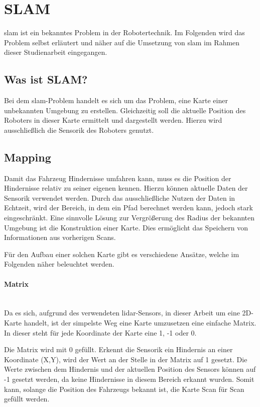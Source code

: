 \section{SLAM}
\label{slam}\ac{slam} ist ein bekanntes Problem in der Robotertechnik. 
Im Folgenden wird das Problem selbst erläutert und näher auf die Umsetzung von \ac{slam} im Rahmen dieser Studienarbeit eingegangen.

\subsection{Was ist SLAM?}
Bei dem \ac{slam}-Problem handelt es sich um das Problem, eine Karte einer unbekannten Umgebung zu erstellen.
Gleichzeitig soll die aktuelle Position des Roboters in dieser Karte ermittelt und dargestellt werden.
Hierzu wird ausschließlich die Sensorik des Roboters genutzt.

\subsection{Mapping}
\label{mapping}Damit das Fahrzeug Hindernisse umfahren kann, muss es die Position der Hindernisse relativ zu seiner eigenen kennen.
Hierzu können aktuelle Daten der Sensorik verwendet werden.
Durch das ausschließliche Nutzen der Daten in Echtzeit, wird der Bereich, in dem ein Pfad berechnet werden kann, jedoch stark eingeschränkt.
Eine sinnvolle Lösung zur Vergrößerung des Radius der bekannten Umgebung ist die Konstruktion einer Karte.
Dies ermöglicht das Speichern von Informationen aus vorherigen Scans.

Für den Aufbau einer solchen Karte gibt es verschiedene Ansätze, welche im Folgenden näher beleuchtet werden.

\paragraph{Matrix} \mbox{}\\
Da es sich, aufgrund des verwendeten \ac{lidar}-Sensors, in dieser Arbeit um eine 2D-Karte handelt, 
ist der simpelste Weg eine Karte umzusetzen eine einfache Matrix.
In dieser steht für jede Koordinate der Karte eine 1, -1 oder 0.

Die Matrix wird mit 0 gefüllt.
Erkennt die Sensorik ein Hindernis an einer Koordinate (X,Y), wird der Wert an der Stelle in der Matrix auf 1 gesetzt.
Die Werte zwischen dem Hindernis und der aktuellen Position des Sensors können auf -1 gesetzt werden,
da keine Hindernisse in diesem Bereich erkannt wurden.
Somit kann, solange die Position des Fahrzeugs bekannt ist, die Karte Scan für Scan gefüllt werden.

